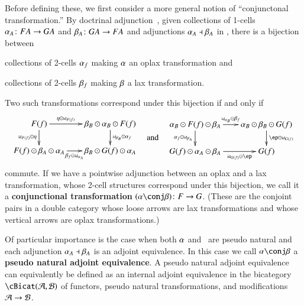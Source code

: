 Before defining these, we first consider a more general notion of ``conjunctonal transformation.''
By doctrinal adjunction~\cite{kelly:doc-adjn}, given collections of
1-cells $\alpha_A\colon FA\to GA$ and $\beta_A\colon GA\to FA$ and
adjunctions $\alpha_A\dashv \beta_A$ in \cB, there is a bijection between
\begin{inparaenum}
\item collections of 2-cells $\alpha_f$ making $\alpha$ an oplax
  transformation and
\item collections of 2-cells $\beta_f$ making $\beta$ a lax
  transformation.
\end{inparaenum}
Two such transformations correspond under this bijection if and only if
\begin{equation}
  \vcenter{\xymatrix@-.5pc{F(f) \ar[r]^-{\eta \odot \mbox{\tiny id}_{F(f)}}
      \ar[d]_{\mbox{\tiny id}_{F(f)}\odot \eta} &
      \be_B\odot \al_B \odot F(f) \ar[d]^{\mbox{\tiny id}_{\be_B} \odot \al_f}\\
      F(f) \odot \be_A\odot \al_A\ar[r]_-{\be_f \odot \mbox{\tiny id}_{\al_A}} &
      \be_B\odot G(f) \odot \al_A}}
  \quad\text{and}\quad
  \vcenter{\xymatrix@-.5pc{\al_B\odot F(f)\odot \be_A
      \ar[r]^-{\mbox{\tiny id}_{\al_B}\odot \be_f}\ar[d]_{\al_f \odot \mbox{\tiny id}_{\be_A}}&
      \al_B \odot \be_B \odot G(f)\ar[d]^{\ep \odot \mbox{\tiny id}_{G(f)}}\\
      G(f)\odot \al_A\odot \be_A \ar[r]_-{\mbox{\tiny id}_{G(f)} \odot \ep} & G(f)}}\label{eq:conjtrans}
\end{equation}
commute.  If we have a pointwise adjunction between an oplax and a lax
transformation, whose 2-cell structures correspond under this
bijection, we call it a \textbf{conjunctional transformation}
$(\al\conj \be)\maps F\to G$.  (These are the conjoint pairs in a
double category whose loose arrows are lax transformations and
whose vertical arrows are oplax transformations.)

Of particular importance is the case when both $\alpha$ and \be\ are
pseudo natural and each adjunction $\alpha_A\dashv \beta_A$ is an adjoint
equivalence.  In this case we call $\al\conj \be$ a \textbf{pseudo
  natural adjoint equivalence}.  A pseudo natural adjoint equivalence
can equivalently be defined as an internal adjoint equivalence in the
bicategory $\cBicat(\cA,\cB)$ of functors, pseudo natural
transformations, and modifications $\mathcal{A}\to\mathcal{B}$. 

